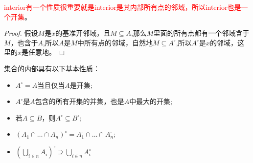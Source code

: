 \textcolor{red}{interior有一个性质很重要就是interior是其内部所有点的邻域，所以interior也是一个开集}。

\begin{proof}
假设$M$是$x$的基准开邻域，且$M \subseteq A$,那么$M$里面的所有点都有一个邻域含于$M$，也含于$A$,所以$A$是$M$中所有点的邻域，自然地$M \subseteq A^{\circ}$,所以$A^{\circ}$是$x$的邻域，这里的$x$是任意地。
\end{proof}


\begin{proposition}
集合的内部具有以下基本性质：
\begin{itemize}
	\item $A^{\circ}=A$当且仅当$A$是开集;
	\item $A^{\circ}$是$A$包含的所有开集的并集，也是$A$中最大的开集;
	\item 若$A \subseteq B$，则$A^{\circ} \subseteq B^{\circ}$;
	\item $(A_1 \cap \ldots \cap A_n)^{\circ}=A_1^{\circ} \cap \ldots \cap A_n^{\circ}$;
	\item ${\left(\bigcup\limits_{i \in n} A_i\right)}^{\circ} \supseteq \bigcup\limits_{i \in n} A_i^{\circ}$
\end{itemize}
\end{proposition}
